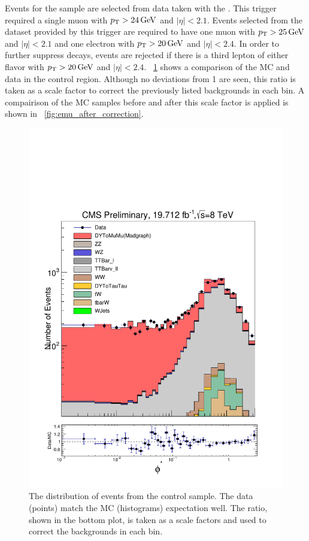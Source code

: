 Events for the \emu sample are selected from data taken with the
\SingleMuonTrigger. This trigger required a single muon with $p_{\mathrm{T}} > 24 \,\text{Ge\hspace{-.08em}V}$
and $|\eta| < 2.1$. Events selected from the dataset provided by this trigger
are required to have one muon with $p_{\mathrm{T}} > 25 \,\text{Ge\hspace{-.08em}V}$ and $|\eta| < 2.1$ and one
electron with $p_{\mathrm{T}} > 20 \,\text{Ge\hspace{-.08em}V}$ and $|\eta| < 2.4$. In order to further suppress
\Z decays, events are rejected if there is a third lepton of either flavor with
$p_{\mathrm{T}} > 20 \,\text{Ge\hspace{-.08em}V}$ and $|\eta| < 2.4$. \FIG~\ref{fig:emu_background_check} shows a
comparison of the MC and data in the control region. Although no deviations
from \num{1} are seen, this ratio is taken as a scale factor to correct the
previously listed backgrounds in each bin. A compairison of the \Ztomumu MC
samples before and after this scale factor is applied is shown in
\FIG~\ref{fig:emu_after_correction}.

\begin{figure}[!htbp]
    \centering
    \includegraphics[width=\textwidth]{figures/phistar_emu.pdf}
    \caption[
        The \phistar distribution of events from the \emu control sample.
    ]{
        The \phistar distribution of events from the \emu control sample. The
        data (points) match the MC (histograms) expectation well. The ratio,
        shown in the bottom plot, is taken as a scale factors and used to
        correct the backgrounds in each bin.
    }
    \label{fig:emu_background_check}
\end{figure}

